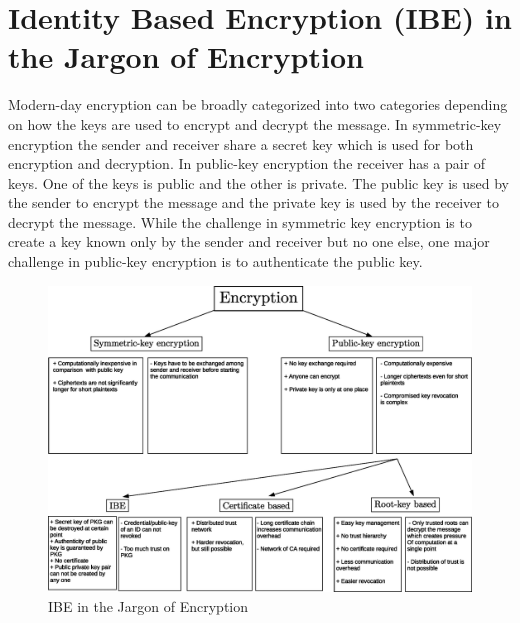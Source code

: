 \documentclass[runningheads,a4paper]{llncs} %
\begin{document}
\section{Identity Based Encryption (IBE) in the Jargon of Encryption} \label{sec:id_based_crypto}
Modern-day encryption can be broadly categorized into two categories depending on how the keys are used to encrypt and decrypt the message. In symmetric-key encryption the sender and receiver share a secret key which is used for both encryption and decryption. In public-key encryption the receiver has a pair of keys. One of the keys is public and the other is private. The public key is used by the sender to encrypt the message and the private key is used by the receiver to decrypt the message. While the challenge in symmetric key encryption is to create a key known only by the sender and receiver but no one else, one major challenge in public-key encryption is to authenticate the public key.
\begin{figure}
\begin{center}
  \includegraphics[width=.98\textwidth]{ibc_in_jargon_of_crypto.eps}
\caption{IBE in the Jargon of Encryption}
\label{fig:ibe_in_the_jargon_of_cryptography}       %
\end{center}
\end{figure}
\end{document}
